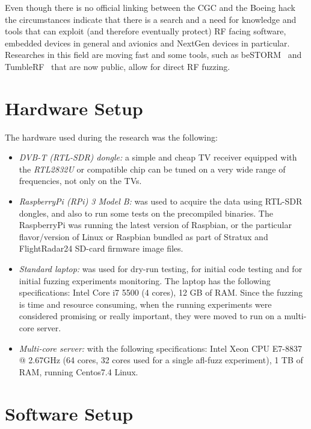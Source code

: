 \documentclass[../main.tex]{subfiles}
\begin{document}
Even though there is no official linking between the CGC and the Boeing hack the
circumstances indicate that there is a search and a need for knowledge and tools
that can exploit (and therefore eventually protect) RF facing software, embedded
devices in general and avionics and NextGen devices in particular. Researches in
this field are moving fast and some tools, such as beSTORM~\cite{bestorm} and
TumbleRF~\cite{tumblerf} that are now public, allow for direct RF fuzzing.

\section{Hardware Setup}

The hardware used during the research was the following:
\begin{itemize}

\item \textit{DVB-T (RTL-SDR) dongle:} a simple and cheap TV receiver equipped with the \emph{RTL2832U} or compatible chip can be tuned on a very wide range of frequencies, not only on the TVs.

\item \textit{RaspberryPi (RPi) 3 Model B:} was used to acquire the data using RTL-SDR dongles, and also to run some tests on the precompiled binaries. The RaspberryPi was running the latest version of Raspbian, or the particular flavor/version of Linux or Raspbian bundled as part of Stratux and FlightRadar24 SD-card firmware image files.

\item \textit{Standard laptop:} was used for dry-run testing, for initial code testing and for initial fuzzing experiments monitoring. The laptop has the following specifications: Intel Core i7 5500 (4 cores), 12 GB of RAM. Since the fuzzing is time and resource consuming, when the running experiments were considered promising or really important, they were moved to run on a multi-core server.

\item \textit{Multi-core server:} with the following specifications: Intel Xeon CPU E7-8837 @ 2.67GHz (64 cores, 32 cores used for a single afl-fuzz experiment), 1 TB of RAM, running Centos7.4 Linux.
\end{itemize}

\section{Software Setup}
\end{document}
